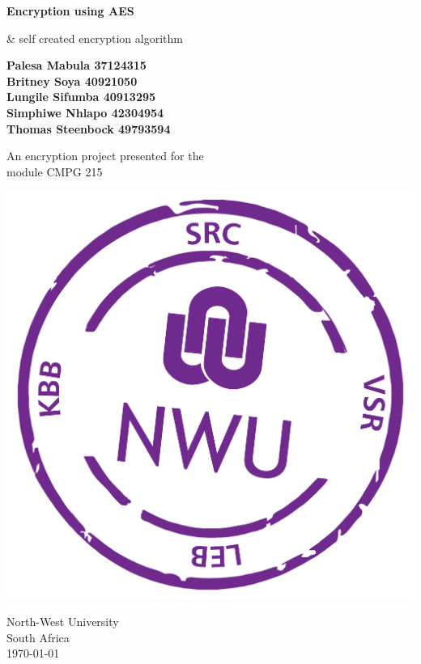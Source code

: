 \documentclass[]{article}
\begin{document}
\begin{titlepage}
    \begin{center}
        \vspace*{1cm}
            
        \Huge
        \textbf{Encryption using AES}
            
        \vspace{0.5cm}
        \LARGE
        \& self created encryption algorithm
            
        \vspace{1.5cm}
        \Large  
        \textbf{Palesa Mabula 37124315\\
        Britney Soya 40921050\\
        Lungile Sifumba 40913295\\
        Simphiwe Nhlapo 42304954\\
        Thomas Steenbock 49793594}
            
        \vfill
        \LARGE  
        An encryption project presented for the\\
        module CMPG 215
            
        \vspace{1cm}
            
        \includegraphics[scale=0.5]{NWUlogo.jpg}
         
        \vspace{0.8cm}

        \Large
        North-West University\\
        South Africa\\
        \today
            
    \end{center}
\end{titlepage}
\end{document}
